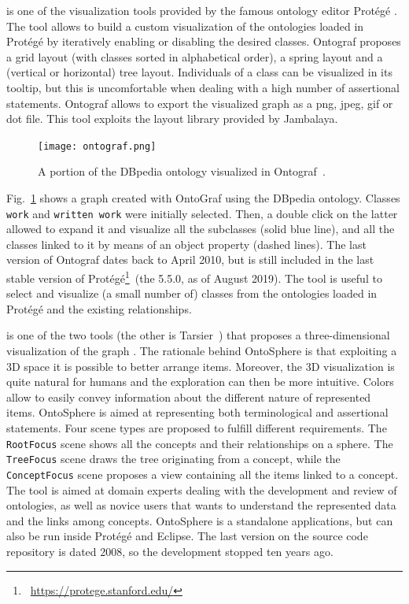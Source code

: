 \begin{description}[wide, labelindent=0pt]
\item[Ontograf] is one of the visualization tools provided by the famous ontology editor Prot\'eg\'e \cite{falconer2010ontograf}. The tool allows to build a custom visualization of the ontologies loaded in Prot\'eg\'e by iteratively enabling or disabling the desired classes. Ontograf proposes a grid layout (with classes sorted in alphabetical order), a spring layout and a (vertical or horizontal) tree layout. Individuals of a class can be visualized in its tooltip, but this is uncomfortable when dealing with a high number of assertional statements. Ontograf allows to export the visualized graph as a png, jpeg, gif or dot file. This tool exploits the layout library provided by Jambalaya.
\begin{figure}
    \centering
    \texttt{[image: ontograf.png]}
    \caption{A portion of the DBpedia ontology visualized in Ontograf~\cite{falconer2010ontograf}.}
    \label{fig:ontograf}
\end{figure}
Fig.~\ref{fig:ontograf} shows a graph created with OntoGraf using the DBpedia ontology. Classes \texttt{work} and \texttt{written work} were initially selected. Then, a double click on the latter allowed to expand it and visualize all the subclasses (solid blue line), and all the classes linked to it by means of an object property (dashed lines). The last version of Ontograf dates back to April 2010, but is still included in the last stable version of Prot\'eg\'e\footnote{\faLink~\url{https://protege.stanford.edu/}}~(the 5.5.0, as of August 2019). The tool is useful to select and visualize (a small number of) classes from the ontologies loaded in Prot\'eg\'e and the existing relationships.

\item[OntoSphere] is one of the two tools (the other is Tarsier~\cite{viola2018interactive}) that proposes a three-dimensional visualization of the graph \cite{bosca2005ontosphere}. The rationale behind OntoSphere is that exploiting a 3D space it is possible to better arrange items. Moreover, the 3D visualization is quite natural for humans and the exploration can then be more intuitive. Colors allow to easily convey information about the different nature of represented items. OntoSphere is aimed at representing both terminological and assertional statements. Four scene types are proposed to fulfill different requirements. The \texttt{RootFocus} scene shows all the concepts and their relationships on a sphere. The \texttt{TreeFocus} scene draws the tree originating from a concept, while the \texttt{ConceptFocus} scene proposes a view containing all the items linked to a concept. The tool is aimed at domain experts dealing with the development and review of ontologies, as well as novice users that wants to understand the represented data and the links among concepts. OntoSphere is a standalone applications, but can also be run inside Prot\'eg\'e and Eclipse. The last version on the source code repository is dated 2008, so the development stopped ten years ago.


\end{description}

